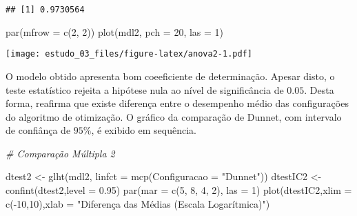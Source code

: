 \documentclass[
]{article}
\newenvironment{Shaded}{\begin{snugshade}}{\end{snugshade}}
\newcommand{\AttributeTok}[1]{\textcolor[rgb]{0.77,0.63,0.00}{#1}}
\newcommand{\CommentTok}[1]{\textcolor[rgb]{0.56,0.35,0.01}{\textit{#1}}}
\newcommand{\DecValTok}[1]{\textcolor[rgb]{0.00,0.00,0.81}{#1}}
\newcommand{\FloatTok}[1]{\textcolor[rgb]{0.00,0.00,0.81}{#1}}
\newcommand{\FunctionTok}[1]{\textcolor[rgb]{0.00,0.00,0.00}{#1}}
\newcommand{\NormalTok}[1]{#1}
\newcommand{\OtherTok}[1]{\textcolor[rgb]{0.56,0.35,0.01}{#1}}
\newcommand{\SpecialCharTok}[1]{\textcolor[rgb]{0.00,0.00,0.00}{#1}}
\newcommand{\StringTok}[1]{\textcolor[rgb]{0.31,0.60,0.02}{#1}}
\begin{document}
\begin{Shaded}
\end{Shaded}

\begin{verbatim}
## [1] 0.9730564
\end{verbatim}

\begin{Shaded}
\begin{Highlighting}[]
\FunctionTok{par}\NormalTok{(}\AttributeTok{mfrow =} \FunctionTok{c}\NormalTok{(}\DecValTok{2}\NormalTok{, }\DecValTok{2}\NormalTok{))}
\FunctionTok{plot}\NormalTok{(mdl2, }\AttributeTok{pch =} \DecValTok{20}\NormalTok{, }\AttributeTok{las =} \DecValTok{1}\NormalTok{)}
\end{Highlighting}
\end{Shaded}

\texttt{[image: estudo\_03\_files/figure-latex/anova2-1.pdf]}

O modelo obtido apresenta bom coeeficiente de determinação. Apesar
disto, o teste estatístico rejeita a hipótese nula ao nível de
significância de \(0.05\). Desta forma, reafirma que existe diferença
entre o desempenho médio das configurações do algoritmo de otimização. O
gráfico da comparação de Dunnet, com intervalo de confiânça de \(95\%\),
é exibido em sequência.

\begin{Shaded}
\begin{Highlighting}[]
\CommentTok{\# Comparação Múltipla 2}

\NormalTok{dtest2 }\OtherTok{\textless{}{-}} \FunctionTok{glht}\NormalTok{(mdl2, }\AttributeTok{linfct =} \FunctionTok{mcp}\NormalTok{(}\AttributeTok{Configuracao =} \StringTok{"Dunnet"}\NormalTok{))}
\NormalTok{dtestIC2 }\OtherTok{\textless{}{-}} \FunctionTok{confint}\NormalTok{(dtest2,}\AttributeTok{level =} \FloatTok{0.95}\NormalTok{)}
\FunctionTok{par}\NormalTok{(}\AttributeTok{mar =} \FunctionTok{c}\NormalTok{(}\DecValTok{5}\NormalTok{, }\DecValTok{8}\NormalTok{, }\DecValTok{4}\NormalTok{, }\DecValTok{2}\NormalTok{), }\AttributeTok{las =} \DecValTok{1}\NormalTok{)}
\FunctionTok{plot}\NormalTok{(dtestIC2,}\AttributeTok{xlim =} \FunctionTok{c}\NormalTok{(}\SpecialCharTok{{-}}\DecValTok{10}\NormalTok{,}\DecValTok{10}\NormalTok{),}\AttributeTok{xlab =} \StringTok{"Diferença das Médias (Escala Logarítmica)"}\NormalTok{)}
\end{Highlighting}
\end{Shaded}
\end{document}

